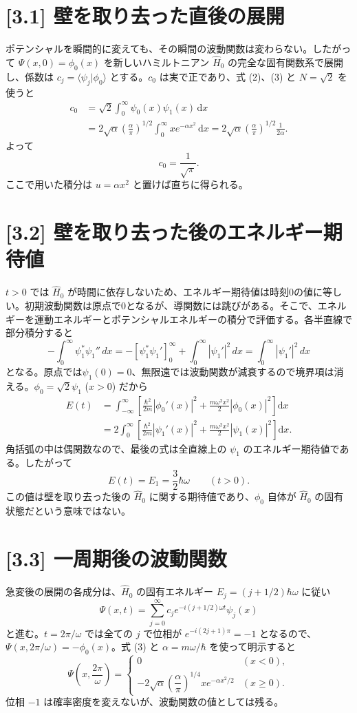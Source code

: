 \documentclass[11pt,a4paper]{article}
\begin{document}
\section*{[3.1] 壁を取り去った直後の展開}
ポテンシャルを瞬間的に変えても、その瞬間の波動関数は変わらない。したがって $\Psi(x,0)=\phi_0(x)$ を新しいハミルトニアン $\hat H_0$ の完全な固有関数系で展開し、係数は $c_j=\langle\psi_j|\phi_0\rangle$ とする。$c_0$ は実で正であり、式 (2)、(3) と $N=\sqrt2$ を使うと
\begin{align*}
c_0&=\sqrt2\int_0^\infty\psi_0(x)\psi_1(x)\,\mathrm dx\\
&=2\sqrt\alpha\left(\frac\alpha\pi\right)^{1/2}
\int_0^\infty x e^{-\alpha x^2}\,\mathrm dx
=2\sqrt\alpha\left(\frac\alpha\pi\right)^{1/2}\frac1{2\alpha}.
\end{align*}
よって
\[
\boxed{c_0=\frac1{\sqrt\pi}}.
\]
ここで用いた積分は $u=\alpha x^2$ と置けば直ちに得られる。

\section*{[3.2] 壁を取り去った後のエネルギー期待値}
$t>0$ では $\hat H_0$ が時間に依存しないため、エネルギー期待値は時刻0の値に等しい。初期波動関数は原点で0となるが、導関数には跳びがある。そこで、エネルギーを運動エネルギーとポテンシャルエネルギーの積分で評価する。各半直線で部分積分すると
\begin{equation}
 -\int_0^\infty\psi_1^*\psi_1''\,dx
 =-[\psi_1^*\psi_1']_0^\infty+\int_0^\infty|\psi_1'|^2\,dx
 =\int_0^\infty|\psi_1'|^2\,dx
\end{equation}
となる。原点では$\psi_1(0)=0$、無限遠では波動関数が減衰するので境界項は消える。$\phi_0=\sqrt2\psi_1$ ($x>0$) だから
\begin{align*}
E(t)&=\int_{-\infty}^{\infty}\left[
\frac{\hbar^2}{2m}|\phi_0'(x)|^2
+\frac{m\omega^2x^2}{2}|\phi_0(x)|^2\right]\mathrm dx\\
&=2\int_0^\infty\left[
\frac{\hbar^2}{2m}|\psi_1'(x)|^2
+\frac{m\omega^2x^2}{2}|\psi_1(x)|^2\right]\mathrm dx.
\end{align*}
角括弧の中は偶関数なので、最後の式は全直線上の $\psi_1$ のエネルギー期待値である。したがって
\[
\boxed{E(t)=E_1=\frac32\hbar\omega\qquad(t>0)}.
\]
この値は壁を取り去った後の $\hat H_0$ に関する期待値であり、$\phi_0$ 自体が $\hat H_0$ の固有状態だという意味ではない。

\section*{[3.3] 一周期後の波動関数}
急変後の展開の各成分は、$\hat H_0$ の固有エネルギー $E_j=(j+1/2)\hbar\omega$ に従い
\[
\Psi(x,t)=\sum_{j=0}^{\infty}c_j
e^{-i(j+1/2)\omega t}\psi_j(x)
\]
と進む。$t=2\pi/\omega$ では全ての $j$ で位相が $e^{-i(2j+1)\pi}=-1$ となるので、$\Psi(x,2\pi/\omega)=-\phi_0(x)$。式 (3) と $\alpha=m\omega/\hbar$ を使って明示すると
\[
\boxed{\Psi\!\left(x,\frac{2\pi}{\omega}\right)=
\begin{cases}
0 &(x<0),\\[2pt]
-2\sqrt\alpha\left(\dfrac\alpha\pi\right)^{1/4}
x e^{-\alpha x^2/2} &(x\geq0).
\end{cases}}
\]
位相 $-1$ は確率密度を変えないが、波動関数の値としては残る。
\end{document}
